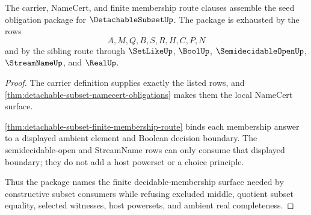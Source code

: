 \begin{theorem}
\label{thm:detachable-subset-obligation-package}
The carrier, NameCert, and finite membership route clauses assemble the seed obligation package for $\DetachableSubsetUp$. The package is exhausted by the rows
$$
A,M,Q,B,S,R,H,C,P,N
$$
and by the sibling route through $\SetLikeUp$, $\BoolUp$, $\SemidecidableOpenUp$, $\StreamNameUp$, and $\RealUp$.
\end{theorem}
\begin{proof}
The carrier definition supplies exactly the listed rows, and \autoref{thm:detachable-subset-namecert-obligations} makes them the local NameCert surface.

\autoref{thm:detachable-subset-finite-membership-route} binds each membership answer to a displayed ambient element and Boolean decision boundary. The semidecidable-open and StreamName rows can only consume that displayed boundary; they do not add a host powerset or a choice principle.

Thus the package names the finite decidable-membership surface needed by constructive subset consumers while refusing excluded middle, quotient subset equality, selected witnesses, host powersets, and ambient real completeness.
\end{proof}


\begin{closurestatus}{\DetachableSubsetUp}
  \theoryclosure{\seedClosure}
  \formalstatus{\encodedDefV}
\end{closurestatus}
